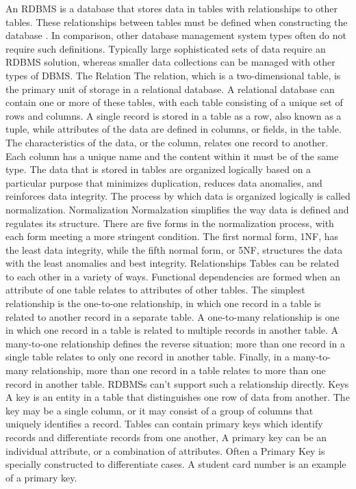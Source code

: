 \documentclass[]{article}
\begin{document}
An RDBMS is a database that stores data in tables with relationships to other tables. These relationships between tables must be defined when constructing the database . In comparison, other  database management system types often do not require such definitions.
Typically large sophisticated sets of data require an RDBMS solution, whereas smaller data collections can be managed with other types of DBMS.
The Relation
The relation, which is a two-dimensional table, is the primary unit of storage in a relational database. A relational database can contain one or more of these tables, with each table consisting of a unique set of rows and columns.
A single record is stored in a table as a row, also known as a tuple, while attributes of the data are defined in columns, or fields, in the table. The characteristics of the data, or the column, relates one record to another. Each column has a unique name and the content within it must be of the same type.
The data that is stored in tables are organized logically based on a particular purpose that minimizes duplication, reduces data anomalies, and reinforces data integrity. The process by which data is organized logically is called normalization.
Normalization
Normalzation simplifies the way data is defined and regulates its structure. There are five forms in the normalization process, with each form meeting a more stringent condition. The first normal form, 1NF, has the least data integrity, while the fifth normal form, or 5NF, structures the data with the least anomalies and best integrity.
Relationships    
Tables can be related to each other in a variety of ways. Functional dependencies are formed when an attribute of one table relates to attributes of other tables.
The simplest relationship is the one-to-one relationship, in which one record in a table is related to another record in a separate table. A one-to-many relationship is one in which one record in a table is related to multiple records in another table.
 A many-to-one relationship defines the reverse situation; more than one record in a single table relates to only one record in another table. Finally, in a many-to-many relationship, more than one record in a table relates to more than one record in another table.  RDBMSs can’t  support such a relationship directly.
Keys     
A key is an entity in a table that distinguishes one row of data from another. The key may be a single column, or it may consist of a group of columns that uniquely identifies a record.
Tables can contain primary keys which identify records and differentiate records from one another, A primary key can be an individual attribute, or a combination of attributes.  Often a Primary Key is specially constructed to differentiate cases. A student card number is an example of a primary key.
\end{document}
